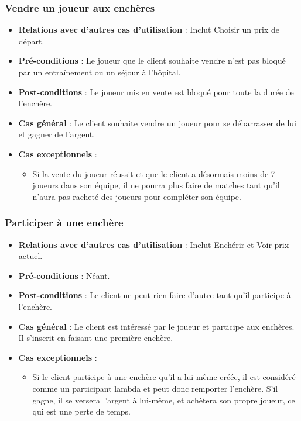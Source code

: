 \documentclass[a4paper,titlepage]{scrreprt}
\begin{document}
    \subsubsection{Vendre un joueur aux enchères}
      \begin{itemize}
        \item \textbf{Relations avec d'autres cas d'utilisation}  : Inclut Choisir un prix de départ.
        \item \textbf{Pré-conditions} : Le joueur que le client souhaite vendre n'est pas bloqué par un entraînement ou un séjour à l'hôpital.
        \item \textbf{Post-conditions} : Le joueur mis en vente est bloqué pour toute la durée de l'enchère.
        \item \textbf{Cas général} : Le client souhaite vendre un joueur pour se débarrasser de lui et gagner de l'argent.
        \item \textbf{Cas exceptionnels} :
          \begin{itemize}
            \item Si la vente du joueur réussit et que le client a désormais moins de 7 joueurs dans son équipe, il ne pourra plus faire de matches tant qu'il n'aura pas racheté des joueurs pour compléter son équipe.
          \end{itemize}
      \end{itemize}

    \subsubsection{Participer à une enchère}
      \begin{itemize}
        \item \textbf{Relations avec d'autres cas d'utilisation}  : Inclut Enchérir et Voir prix actuel.
        \item \textbf{Pré-conditions} : Néant.
        \item \textbf{Post-conditions} : Le client ne peut rien faire d'autre tant qu'il participe à l'enchère.
        \item \textbf{Cas général} : Le client est intéressé par le joueur et participe aux enchères. Il s'inscrit en faisant une première enchère.
        \item \textbf{Cas exceptionnels} :
          \begin{itemize}
            \item Si le client participe à une enchère qu'il a lui-même créée, il est considéré comme un participant lambda et peut donc remporter l'enchère. S'il gagne, il se versera l'argent à lui-même, et achètera son propre joueur, ce qui est une perte de temps.
          \end{itemize}
      \end{itemize}
\end{document}
